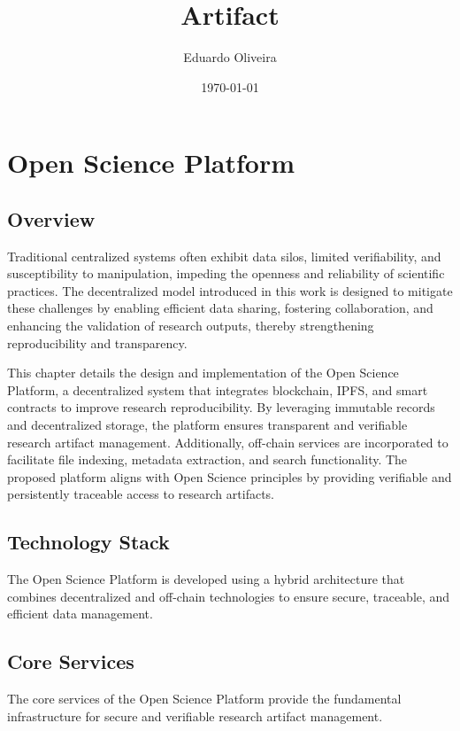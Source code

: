 \documentclass{article}
\title{Artifact}
\author{Eduardo Oliveira}
\date{\today}
\begin{document}
\maketitle

\section{Open Science Platform}

\subsection{Overview}

Traditional centralized systems often exhibit data silos, limited verifiability, and susceptibility to manipulation, impeding the openness and reliability of scientific practices. The decentralized model introduced in this work is designed to mitigate these challenges by enabling efficient data sharing, fostering collaboration, and enhancing the validation of research outputs, thereby strengthening reproducibility and transparency.

This chapter details the design and implementation of the Open Science Platform, a decentralized system that integrates blockchain, IPFS, and smart contracts to improve research reproducibility. By leveraging immutable records and decentralized storage, the platform ensures transparent and verifiable research artifact management. Additionally, off-chain services are incorporated to facilitate file indexing, metadata extraction, and search functionality. The proposed platform aligns with Open Science principles by providing verifiable and persistently traceable access to research artifacts.

\subsection{Technology Stack}
The Open Science Platform is developed using a hybrid architecture that combines decentralized and off-chain technologies to ensure secure, traceable, and efficient data management.

\subsection{Core Services}

The core services of the Open Science Platform provide the fundamental infrastructure for secure and verifiable research artifact management.
\end{document}
